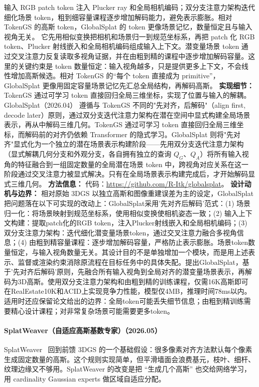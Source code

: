 输入 RGB patch token 注入 Plucker ray 和全局相机编码；双分支注意力架构迭代细化场景 token，粗到细容量课程逐步增加解码能力，避免表示膨胀。相对 TokenGS 的高斯 token，GlobalSplat 的 token 更像场景记忆，数量恒定且与输入视角无关。
它先用相似变换把相机和场景归一到规范坐标系，再把 patch 化 RGB token、Plucker 射线嵌入和全局相机编码组成输入上下文。潜变量场景 token 通过交叉注意力反复读取多视角证据，并在由粗到精的课程中逐步增加解码容量。这里的关键约束是 token 数量恒定：输入视角越多，只是提供更多上下文，不会线性增加高斯候选。相对 TokenGS 的“每个 token 直接成为 primitive”，GlobalSplat 更像用固定容量场景记忆先汇总全局结构，再解码高斯。
\textbf{实现细节：} TokenGS 通过可学习 token 直接回归全局三维坐标，实现了位置与输入的解耦。GlobalSplat（2026.04） 遵循与 TokenGS 不同的"先对齐，后解码"（align first, decode later）原则，通过双分支迭代注意力架构在潜在空间中显式构建全局场景表示，再从中解码三维几何。TokenGS 通过可学习 token 直接回归全局三维坐标，而解码前的对齐仍依赖 Transformer 的隐式学习。GlobalSplat 则将"先对齐"显式化为一个独立的潜在场景表示构建阶段——先用双分支迭代注意力架构（显式解耦几何分支和外观分支，各自拥有独立的查询 $Q_G$、$Q_A$）将所有输入视角的特征融合到一组固定数量的全局潜在场景 token 中，跨视角对应关系在这一阶段通过交叉注意力被显式解决。只有在全局场景表示构建完成后，才开始解码显式三维几何。
\textbf{方法信息：} 代码：\url{https://github.com/R-Itk/globalsplat}。
\textbf{设计动机与边界：} 相对原始 3DGS 以独立高斯和图像重建误差为主的设定，GlobalSplat 把问题落在以下可实现的改动上：GlobalSplat采用'先对齐后解码'范式：(1) 场景归一化：将场景映射到规范坐标系，使用相似变换使相机姿态一致；(2) 输入上下文构建：提取patch化的RGB token，注入Plucker射线嵌入和全局相机编码；(3) 双分支注意力架构：迭代细化潜变量场景token，通过交叉注意力融合多视角信息；(4) 由粗到精容量课程：逐步增加解码容量，严格防止表示膨胀。场景token数量恒定，与输入视角数量无关。其设计目的不是单独增加一个模块，而是用上述表示、监督或渲染约束消除原流程在目标任务中的具体失配。提出GlobalSplat，基于'先对齐后解码'原则，先融合所有输入视角到全局对齐的潜变量场景表示，再解码为3D高斯。使用双分支注意力架构和由粗到精的训练课程，仅需16K高斯即可在RealEstate10K和ACID上实现竞争力性能，模型仅4MB，推理时间78ms以内。适用时还应保留论文给出的边界：全局token可能丢失细节信息；由粗到精训练需要精心设计课程；对非常复杂场景可能需要更多token。
\paragraph{SplatWeaver（自适应高斯基数专家）（2026.05）}
SplatWeaver~\cite{2605_07287} 回到前馈 3DGS 的一个基础假设：很多像素对齐方法默认每个像素生成固定数量的高斯。这个规则实现简单，但平滑墙面会浪费基元，枝叶、细杆、纹理边缘又不够用。SplatWeaver 的改变是把 ``生成几个高斯'' 也交给网络学习，用 cardinality Gaussian experts 做区域自适应分配。

